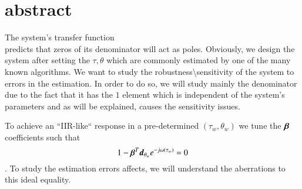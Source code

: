 \section{abstract}
\par The system's transfer function
$$

$$
predicts that zeros of its denominator will act as poles. Obviously, we design the system after setting the $\tau, \theta$ which are commonly estimated by one of the many known algorithms. We want to study the robustness\textbackslash sensitivity of the system to errors in the estimation. In order to do so, we will study mainly the denominator due to the fact that it has the $ 1 $ element which is independent of the system's parameters and as will be explained, causes the sensitivity issues.

\par To achieve an ``IIR-like`` response in a pre-determined $(\tau_{w}, \theta_{w})$ we tune the $\boldsymbol{\beta}$ coefficients such that 
$$ 1-\boldsymbol{\beta}^{T}\boldsymbol{d}_{\theta_{w}}e^{-j\omega (\tau_{w})}=0 $$. To study the estimation errors affects, we will understand the aberrations to this ideal equality. 

